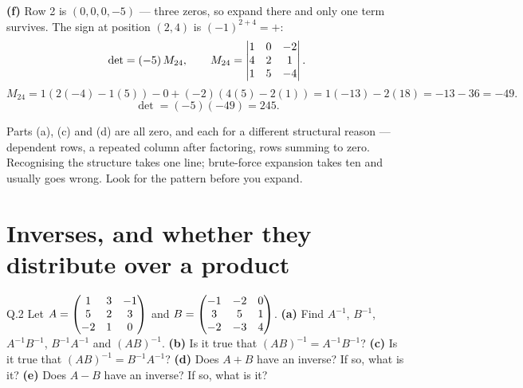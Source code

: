\begin{solution}
\medskip
\textbf{(f)} Row 2 is $(0,0,0,-5)$ --- three zeros, so expand there and only one
term survives. The sign at position $(2,4)$ is $(-1)^{2+4}=+$:
\[
\det=(-5)\,M_{24}, \qquad
M_{24}=\begin{vmatrix}1&0&-2\\4&2&1\\1&5&-4\end{vmatrix}.
\]
\[
M_{24}=1(2(-4)-1(5))-0+(-2)(4(5)-2(1))=1(-13)-2(18)=-13-36=-49 .
\]
\[
\det=(-5)(-49)=245 .
\]

\end{solution}

\begin{pitfall}
Parts (a), (c) and (d) are all zero, and each for a different structural reason
--- dependent rows, a repeated column after factoring, rows summing to zero.
Recognising the structure takes one line; brute-force expansion takes ten and
usually goes wrong. Look for the pattern before you expand.
\end{pitfall}

\section{Inverses, and whether they distribute over a product}

\begin{question}{Q.2}
Let $A=\begin{pmatrix}1&3&-1\\5&2&3\\-2&1&0\end{pmatrix}$ and $B=\begin{pmatrix}-1&-2&0\\3&5&1\\-2&-3&4\end{pmatrix}$.
\textbf{(a)} Find $A^{-1}$, $B^{-1}$, $A^{-1}B^{-1}$, $B^{-1}A^{-1}$ and
$(AB)^{-1}$.
\textbf{(b)} Is it true that $(AB)^{-1}=A^{-1}B^{-1}$?
\textbf{(c)} Is it true that $(AB)^{-1}=B^{-1}A^{-1}$?
\textbf{(d)} Does $A+B$ have an inverse? If so, what is it?
\textbf{(e)} Does $A-B$ have an inverse? If so, what is it?
\end{question}

